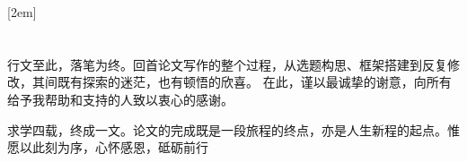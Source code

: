
[2em]{\vspace{0.25em}\xiaosi\song}
             {{\thecontentslabel}\qquad}{} 
             {\contentspage} %
\chapter*{}
行文至此，落笔为终。回首论文写作的整个过程，从选题构思、框架搭建到反复修改，其间既有探索的迷茫，也有顿悟的欣喜。
在此，谨以最诚挚的谢意，向所有给予我帮助和支持的人致以衷心的感谢。

求学四载，终成一文。论文的完成既是一段旅程的终点，亦是人生新程的起点。惟愿以此刻为序，心怀感恩，砥砺前行